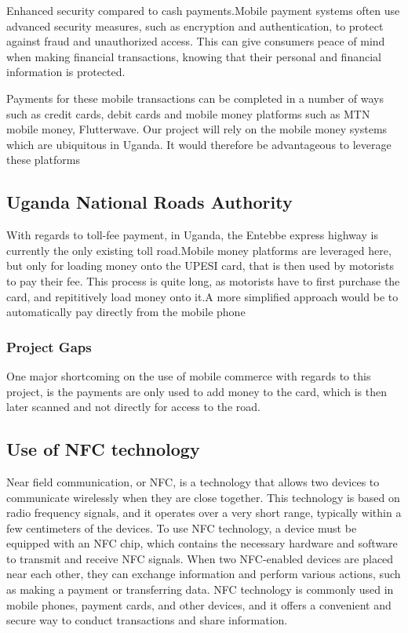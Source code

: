Enhanced security compared to cash payments.Mobile payment systems often use advanced security measures, such as encryption and authentication, to protect against fraud and unauthorized access. This can give consumers peace of mind when making financial transactions, knowing that their personal and financial information is protected.


Payments for these mobile transactions can be completed in a number of ways such as credit cards, debit cards and mobile money platforms such as MTN mobile money, Flutterwave. Our project will rely on the mobile money systems which are ubiquitous in Uganda\cite{baah_state_2021}. It would therefore be advantageous to leverage these platforms

\subsection{Uganda National Roads Authority}
With regards to toll-fee payment, in Uganda, the Entebbe express highway is currently the only existing toll road.Mobile money platforms are leveraged here, but only for loading money onto the UPESI card,\cite{unra_news_2022} that is then used by motorists to pay their fee. This process is quite long, as motorists have to first purchase the card, and repititively load money onto it.A more simplified approach would be to automatically pay directly from the mobile phone

\subsubsection{Project Gaps}
One major shortcoming on the use of mobile commerce with regards to this project, is the payments are only used to add money to the card, which is then later scanned and not directly for access to the road.

\subsection{Use of NFC technology}
Near field communication, or NFC, is a technology that allows two devices to communicate wirelessly when they are close together. This technology is based on radio frequency signals, and it operates over a very short range, typically within a few centimeters of the devices. To use NFC technology, a device must be equipped with an NFC chip, which contains the necessary hardware and software to transmit and receive NFC signals\cite{coskun_survey_2015}. When two NFC-enabled devices are placed near each other, they can exchange information and perform various actions, such as making a payment or transferring data. NFC technology is commonly used in mobile phones, payment cards, and other devices, and it offers a convenient and secure way to conduct transactions and share information.

